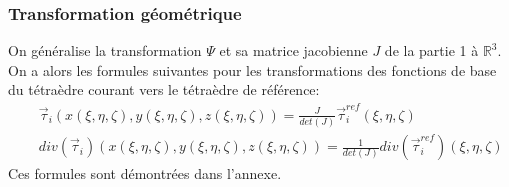\documentclass[a4paper,12pt]{article}
\begin{document}
\subsubsection{Transformation géométrique}
On généralise la transformation $\Psi$ et sa matrice jacobienne $J$ de la partie 1 à $\mathbb{R}^{3}$. 
On a alors les formules suivantes pour les transformations des fonctions de base du tétraèdre courant vers le tétraèdre de référence: 
\begin{eqnarray*}
& &\vec{\tau}_{i}(x(\xi, \eta, \zeta),y(\xi, \eta, \zeta), z(\xi, \eta, \zeta)) = \frac{J}{det(J)}\vec{\tau}_{i}^{ref}(\xi, \eta, \zeta) \\
& &div(\vec{\tau}_{i})(x(\xi, \eta, \zeta),y(\xi, \eta, \zeta), z(\xi, \eta, \zeta)) = \frac{1}{det(J)} div(\vec{\tau}_{i}^{ref})(\xi, \eta, \zeta)
\end{eqnarray*}
Ces formules sont démontrées dans l'annexe.
\end{document}
